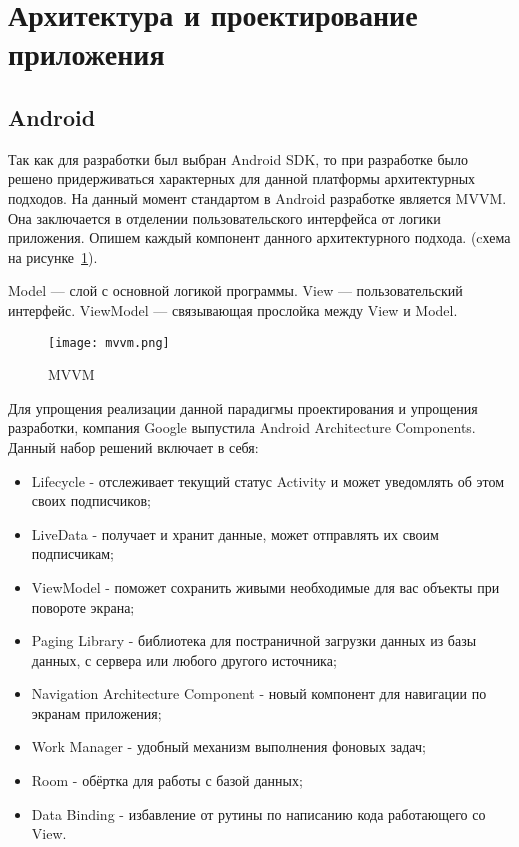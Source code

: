 \section{Архитектура и проектирование приложения}
\label{sec:arch_and_mod}
 
\subsection{Android}
Так как для разработки был выбран Android SDK, то при разработке было решено придерживаться характерных для данной платформы архитектурных подходов.
На данный момент стандартом в Android разработке является MVVM.
Она заключается в отделении пользовательского интерфейса от логики приложения. Опишем каждый компонент данного архитектурного подхода. (cхема на рисунке~\ref{fig:arch:docs_connections}).

Model — слой с основной логикой программы.
View — пользовательский интерфейс.
ViewModel — связывающая прослойка между View и Model.

\begin{figure}[H]
 \centering
   \texttt{[image: mvvm.png]} 
   \caption{MVVM}
   \label{fig:arch:docs_connections}
\end{figure}

Для упрощения реализации данной парадигмы проектирования и упрощения разработки, компания Google выпустила Android Architecture Components. Данный набор решений включает в себя:

\begin{itemize}
 \item Lifecycle - отслеживает текущий статус Activity и может уведомлять об этом своих подписчиков;
 \item LiveData - получает и хранит данные, может отправлять их своим подписчикам;
 \item ViewModel - поможет сохранить живыми необходимые для вас объекты при повороте экрана;
 \item Paging Library - библиотека для постраничной загрузки данных из базы данных, с сервера или любого другого источника;
 \item Navigation Architecture Component - новый компонент для навигации по экранам приложения;
 \item Work Manager - удобный механизм выполнения фоновых задач;
 \item Room - обёртка для работы с базой данных;
 \item Data Binding - избавление от рутины по написанию кода работающего со View.
 \end{itemize}

